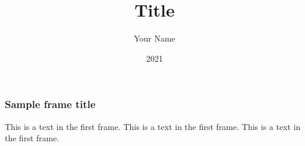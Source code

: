 \documentclass[xcolor=dvipsnames]{beamer}
\title{Title}
\author{Your Name}
\institute{Your Organization}
\date{2021}
\begin{document}
\frame{\titlepage}

\begin{frame}
\frametitle{Sample frame title}
This is a text in the first frame. This is a text in the first frame. This is a text in the first frame.
\end{frame}
\end{document}
